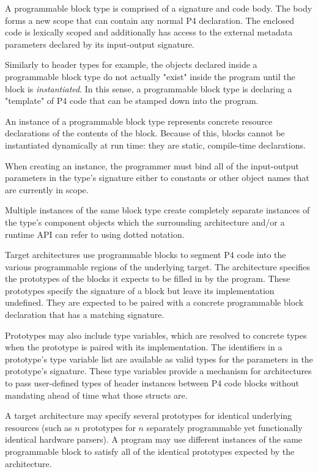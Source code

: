 A programmable block type is comprised of a signature and code body. The body
forms a new scope that can contain any normal P4 declaration. The enclosed
code is lexically scoped and additionally has access to the external
metadata parameters declared by its input-output signature.

Similarly to header types for example, the objects declared inside a
programmable block type do not actually "exist" inside the program until
the block is \textit{instantiated}.  In this sense, a programmable block
type is declaring a "template" of P4 code that can be stamped down into the
program.


An instance of a programmable block type represents concrete resource
declarations of the contents of the block.  Because of this, blocks cannot
be instantiated dynamically at run time: they are static, compile-time
declarations.

When creating an instance, the programmer must bind all of the input-output
parameters in the type's signature either to constants or other object names
that are currently in scope. 

Multiple instances of the same block type create completely separate
instances of the type's component objects which the surrounding architecture
and/or a runtime API can refer to using dotted notation.


Target architectures use programmable blocks to segment P4 code into the
various programmable regions of the underlying target.  The architecture
specifies the prototypes of the blocks it expects to be filled in by the
program.  These prototypes specify the signature of a block but leave its
implementation undefined.  They are expected to be paired with a concrete
programmable block declaration that has a matching signature.

Prototypes may also include type variables, which are resolved to
concrete types when the prototype is paired with its implementation.  The
identifiers in a prototype's type variable list are available as valid types
for the parameters in the prototype's signature. These type variables provide
a mechanism for architectures to pass user-defined types of header instances
between P4 code blocks without mandating ahead of time what those structs are.

A target architecture may specify several prototypes for identical underlying
resources (such as $n$ prototypes for $n$ separately programmable yet
functionally identical hardware parsers).  A program may use different
instances of the same programmable block to satisfy all of the identical
prototypes expected by the architecture.

